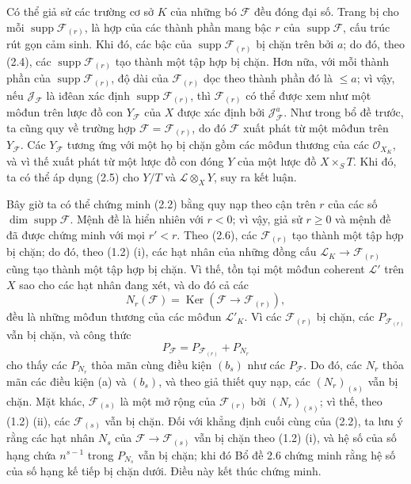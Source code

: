 Có thể giả sử các trường cơ sở $K$ của những bó $\mathcal F$ đều đóng đại số.
Trang bị cho mỗi $\operatorname{supp}\mathcal F_{(r)}$, là hợp của các thành
phần mang bậc $r$
của $\operatorname{supp}\mathcal F$, cấu trúc rút gọn cảm sinh. Khi đó, các
bậc của $\operatorname{supp}\mathcal F_{(r)}$ bị chặn trên bởi $a$; do đó,
theo (2.4), các $\operatorname{supp}\mathcal F_{(r)}$ tạo thành một tập hợp bị
chặn. Hơn nữa, với mỗi thành phần của
$\operatorname{supp}\mathcal F_{(r)}$, độ dài của $\mathcal F_{(r)}$ dọc theo
thành phần đó là $\leq a$; vì vậy, nếu $\mathcal J_{\mathcal F}$ là iđêan xác
định $\operatorname{supp}\mathcal F_{(r)}$, thì $\mathcal F_{(r)}$
có thể được xem như một môđun trên lược đồ con $Y_{\mathcal F}$ của $X$ được
xác định bởi $\mathcal J_{\mathcal F}^{a}$. Như trong bổ đề trước, ta cũng quy
về trường hợp $\mathcal F=\mathcal F_{(r)}$, do đó $\mathcal F$ xuất phát từ
một môđun trên $Y_{\mathcal F}$. Các $Y_{\mathcal F}$ tương ứng với một họ bị
chặn gồm các môđun thương của các $\mathcal O_{X_K}$, và vì thế xuất phát từ
một lược đồ con đóng $Y$ của một lược đồ $X\times_S T$. Khi đó, ta có thể áp
dụng (2.5) cho $Y/T$ và $\mathcal L\otimes_XY$, suy ra kết luận.

Bây giờ ta có thể chứng minh (2.2) bằng quy nạp theo cận trên $r$ của các số
$\dim\operatorname{supp}\mathcal F$. Mệnh đề là hiển nhiên với $r<0$; vì vậy,
giả sử $r\geq0$ và mệnh đề đã được chứng minh với mọi $r'<r$. Theo (2.6), các
$\mathcal F_{(r)}$ tạo thành một tập hợp bị chặn; do đó, theo (1.2) (i), các
hạt nhân của những đồng cấu
$\mathcal L_K\longrightarrow\mathcal F_{(r)}$ cũng tạo thành một tập hợp bị
chặn. Vì thế, tồn tại một môđun coherent $\mathcal L'$ trên $X$ sao cho các hạt
nhân đang xét, và do đó cả các
\[
N_r(\mathcal F)=\operatorname{Ker}(\mathcal F\longrightarrow\mathcal F_{(r)}),
\]
đều là những môđun thương của các môđun $\mathcal L'_K$. Vì các
$\mathcal F_{(r)}$ bị chặn, các $P_{\mathcal F_{(r)}}$ vẫn bị chặn, và công
thức
\[
P_{\mathcal F}=P_{\mathcal F_{(r)}}+P_{N_r}
\]
cho thấy các $P_{N_r}$ thỏa mãn cùng điều kiện $(b_s)$ như các
$P_{\mathcal F}$. Do đó, các $N_r$ thỏa mãn các điều kiện (a) và $(b_s)$, và
theo giả thiết quy nạp, các $(N_r)_{(s)}$ vẫn bị chặn. Mặt khác,
$\mathcal F_{(s)}$ là một mở rộng của $\mathcal F_{(r)}$ bởi
$(N_r)_{(s)}$; vì thế, theo (1.2) (ii), các $\mathcal F_{(s)}$ vẫn bị chặn.
Đối với khẳng định cuối cùng của (2.2), ta lưu ý rằng các hạt nhân $N_s$ của
$\mathcal F\longrightarrow\mathcal F_{(s)}$ vẫn bị chặn theo (1.2) (i), và hệ
số của số hạng chứa $n^{s-1}$ trong $P_{N_s}$ vẫn bị chặn; khi đó Bổ đề 2.6
chứng minh rằng hệ số của số hạng kế tiếp bị chặn dưới. Điều này kết thúc chứng
minh.

